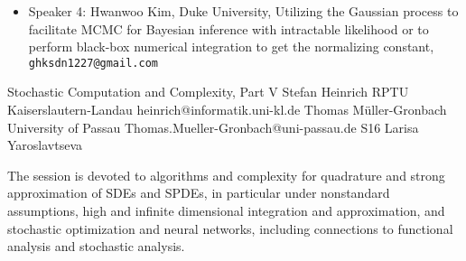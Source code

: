 \begin{session}
\begin{itemize}
 \item Speaker 4: Hwanwoo Kim, Duke University, Utilizing the Gaussian process to facilitate MCMC for Bayesian inference with intractable likelihood or to perform black-box numerical integration to get the normalizing constant, \texttt{ghksdn1227@gmail.com}
 \end{itemize}
 \begin{comment}
 If you would like to include references, please do so by creating a simple list numbered by [1], [2], [3], \ldots. See example below.
 Please do not use the \texttt{bibliography} environment or \texttt{bibtex} files.
 \begin{enumerate}
 \item[{[1]}] Niederreiter, Harald (1992). {\it Random number generation and quasi-Monte Carlo methods}. Society for Industrial and Applied Mathematics (SIAM).
 \item[{[2]}] Roberts, Gareth O, \& Rosenthal, Jeffrey S. (2002).  Optimal scaling for various Metropolis-Hastings algorithms, \textbf{16}(4), 351--367.
 \end{enumerate}
 Equations may be used if they are referenced. Please note that the equation numbers may be different (but will be cross-referenced correctly) in the final program book.
 \end{comment}
\end{session}



\clearpage

\begin{session}
 {Stochastic Computation and Complexity, Part V}%
 {Stefan Heinrich}%
 {RPTU Kaiserslautern-Landau}%
 {heinrich@informatik.uni-kl.de}%
 {Thomas M\"uller-Gronbach}%
 {University of Passau}%
 {Thomas.Mueller-Gronbach@uni-passau.de}%
 {S16}%
 {Larisa Yaroslavtseva}%

 The session is devoted to algorithms and complexity for
 quadrature and strong approximation of SDEs and SPDEs, in particular under nonstandard assumptions,
 high and infinite dimensional integration and approximation, and
 stochastic optimization and neural networks,
 including connections to functional analysis and stochastic analysis.
 \medskip
\end{session}

